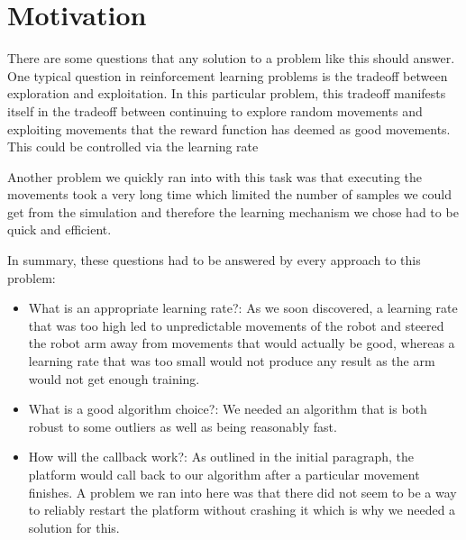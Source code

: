 \section{Motivation} \label{sec:motivation}

There are some questions that any solution to a problem like this should answer. One typical question in reinforcement learning problems is the tradeoff between exploration and exploitation. In this particular problem, this tradeoff manifests itself in the tradeoff between continuing to explore random movements and exploiting movements that the reward function has deemed as good movements. This could be controlled via the learning rate

Another problem we quickly ran into with this task was that executing the movements took a very long time which limited the number of samples we could get from the simulation and therefore the learning mechanism we chose had to be quick and efficient. 

In summary, these questions had to be answered by every approach to this problem:

\begin{itemize}
	\item What is an appropriate learning rate?: As we soon discovered, a learning rate that was too high led to unpredictable movements of the robot and steered the robot arm away from movements that would actually be good, whereas a learning rate that was too small would not produce any result as the arm would not get enough training.
	\item What is a good algorithm choice?: We needed an algorithm that is both robust to some outliers as well as being reasonably fast.
	\item How will the callback work?: As outlined in the initial paragraph, the platform would call back to our algorithm after a particular movement finishes. A problem we ran into here was that there did not seem to be a way to reliably restart the platform without crashing it which is why we needed a solution for this.
\end{itemize}

